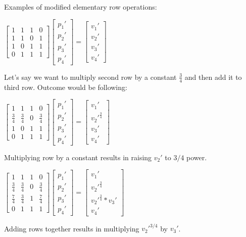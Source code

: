 \documentclass{article}
\begin{document}
Examples of modified elementary row operations:

$
\left[\begin{array}{cccc}1&1&1&0\\1&1&0&1\\1&0&1&1\\0&1&1&1\end{array}\right]
\left[\begin{array}{c}p_1'\\p_2'\\p_3'\\p_4'\end{array}\right] = 
\left[\begin{array}{c}v_1'\\v_2'\\v_3'\\v_4'\end{array}\right]
$

Let's say we want to multiply second row by a constant $\frac{3}{4}$ and then add it to third row. Outcome would be following:

$
\left[\begin{array}{cccc}1&1&1&0\\\frac{3}{4}&\frac{3}{4}&0&\frac{3}{4}\\1&0&1&1\\0&1&1&1\end{array}\right]
\left[\begin{array}{c}p_1'\\p_2'\\p_3'\\p_4'\end{array}\right] = 
\left[\begin{array}{c}v_1'\\v_2'^{\frac{3}{4}}\\v_3'\\v_4'\end{array}\right]
$

Multiplying row by a constant results in raising $v_2'$ to $3/4$ power.

$
\left[\begin{array}{cccc}1&1&1&0\\\frac{3}{4}&\frac{3}{4}&0&\frac{3}{4}\\\frac{7}{4}&\frac{3}{4}&1&\frac{7}{4}\\0&1&1&1\end{array}\right]
\left[\begin{array}{c}p_1'\\p_2'\\p_3'\\p_4'\end{array}\right] = 
\left[\begin{array}{c}v_1'\\v_2'^{\frac{3}{4}}\\v_2'^{\frac{3}{4}}*v_3'\\v_4'\end{array}\right]
$

Adding rows together results in multiplying $v_2'^{3/4}$ by $v_3'$.
\end{document}
